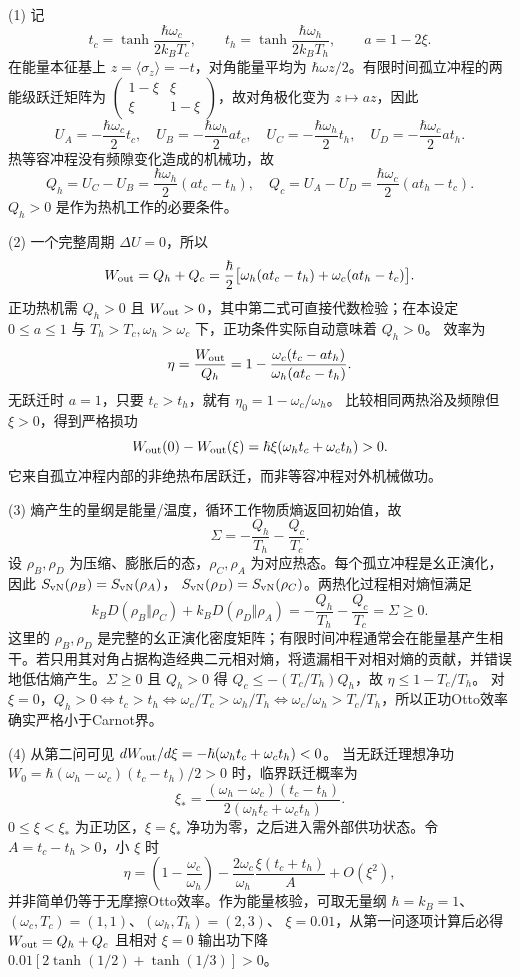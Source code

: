 (1) 记
\[
t_c=\tanh\frac{\hbar\omega_c}{2k_BT_c},\qquad
t_h=\tanh\frac{\hbar\omega_h}{2k_BT_h},\qquad
a=1-2\xi.
\]
在能量本征基上 \(z=\langle\sigma_z\rangle=-t\)，对角能量平均为 \(\hbar\omega z/2\)。有限时间孤立冲程的两能级跃迁矩阵为
\(\begin{pmatrix}1-\xi&\xi\\\xi&1-\xi\end{pmatrix}\)，故对角极化变为 \(z\mapsto az\)，因此
\[
U_A=-\frac{\hbar\omega_c}{2}t_c,\quad
U_B=-\frac{\hbar\omega_h}{2}a t_c,\quad
U_C=-\frac{\hbar\omega_h}{2}t_h,\quad
U_D=-\frac{\hbar\omega_c}{2}a t_h.
\]
热等容冲程没有频隙变化造成的机械功，故
\[
Q_h=U_C-U_B=\frac{\hbar\omega_h}{2}(a t_c-t_h),\quad
Q_c=U_A-U_D=\frac{\hbar\omega_c}{2}(a t_h-t_c).
\]
\(Q_h>0\) 是作为热机工作的必要条件。

(2) 一个完整周期 \(\Delta U=0\)，所以
\[
W_{\rm out}=Q_h+Q_c
=\frac\hbar2\big[\omega_h(a t_c-t_h)+
\omega_c(a t_h-t_c)\big].
\]
正功热机需 \(Q_h>0\) 且 \(W_{\rm out}>0\)，其中第二式可直接代数检验；在本设定 \(0\le a\le1\) 与 \(T_h>T_c,\omega_h>\omega_c\) 下，正功条件实际自动意味着 \(Q_h>0\)。
效率为
\[
\eta=\frac{W_{\rm out}}{Q_h}
=1-\frac{\omega_c(t_c-a t_h)}{\omega_h(a t_c-t_h)}.
\]
无跃迁时 \(a=1\)，只要 \(t_c>t_h\)，就有
\(\eta_0=1-\omega_c/\omega_h\)。
比较相同两热浴及频隙但 \(\xi>0\)，得到严格损功
\[
W_{\rm out}(0)-W_{\rm out}(\xi)
=\hbar\xi(\omega_h t_c+\omega_c t_h)>0.
\]
它来自孤立冲程内部的非绝热布居跃迁，而非等容冲程对外机械做功。

(3) 熵产生的量纲是能量/温度，循环工作物质熵返回初始值，故
\[
\Sigma=-\frac{Q_h}{T_h}-\frac{Q_c}{T_c}.
\]
设 \(\rho_B,\rho_D\) 为压缩、膨胀后的态，\(\rho_C,\rho_A\) 为对应热态。每个孤立冲程是幺正演化，因此 \(S_{\rm vN}(\rho_B)=S_{\rm vN}(\rho_A)\)，
\(S_{\rm vN}(\rho_D)=S_{\rm vN}(\rho_C)\)。两热化过程相对熵恒满足
\[
k_B D(\rho_B\Vert\rho_C)
+k_B D(\rho_D\Vert\rho_A)
=-\frac{Q_h}{T_h}-\frac{Q_c}{T_c}=\Sigma\ge0.
\]
这里的 \(\rho_B,\rho_D\) 是完整的幺正演化密度矩阵；有限时间冲程通常会在能量基产生相干。若只用其对角占据构造经典二元相对熵，将遗漏相干对相对熵的贡献，并错误地低估熵产生。 \(\Sigma\ge0\) 且 \(Q_h>0\) 得
\(Q_c\le-(T_c/T_h)Q_h\)，故
\(\eta\le1-T_c/T_h\)。
对 \(\xi=0\)，\(Q_h>0\iff t_c>t_h\iff
\omega_c/T_c>\omega_h/T_h\iff
\omega_c/\omega_h>T_c/T_h\)，所以正功Otto效率确实严格小于Carnot界。

(4) 从第二问可见
\(dW_{\rm out}/d\xi=-\hbar(\omega_h t_c+\omega_c t_h)<0\)。
当无跃迁理想净功 \(W_0=\hbar(\omega_h-\omega_c)(t_c-t_h)/2>0\) 时，临界跃迁概率为
\[
\xi_*=\frac{(\omega_h-\omega_c)(t_c-t_h)}
{2(\omega_h t_c+\omega_c t_h)}.
\]
\(0\le\xi<\xi_*\) 为正功区，\(\xi=\xi_*\) 净功为零，之后进入需外部供功状态。令
\(A=t_c-t_h>0\)，小 \(\xi\) 时
\[
\eta=\left(1-\frac{\omega_c}{\omega_h}\right)
-\frac{2\omega_c}{\omega_h}
\frac{\xi(t_c+t_h)}{A}+O(\xi^2),
\]
并非简单仍等于无摩擦Otto效率。作为能量核验，可取无量纲
\(\hbar=k_B=1\)、\((\omega_c,T_c)=(1,1)\)、\((\omega_h,T_h)=(2,3)\)、
\(\xi=0.01\)，从第一问逐项计算后必得
\(W_{\rm out}=Q_h+Q_c\) 且相对 \(\xi=0\) 输出功下降
\(0.01[2\tanh(1/2)+\tanh(1/3)]>0\)。

